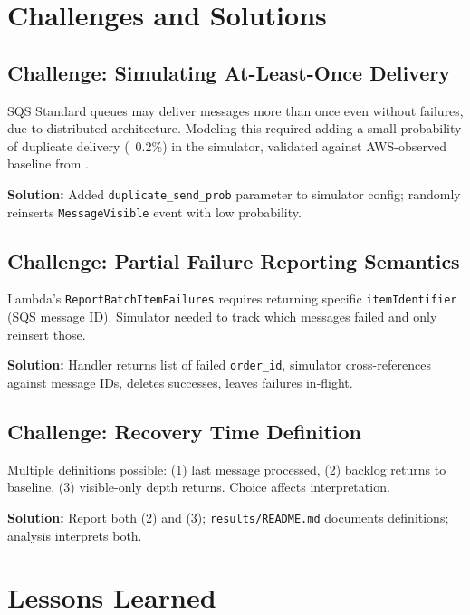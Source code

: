 \section{Challenges and Solutions}

\subsection{Challenge: Simulating At-Least-Once Delivery}

SQS Standard queues may deliver messages more than once even without failures, due to distributed architecture. Modeling this required adding a small probability of duplicate delivery (~0.2\%) in the simulator, validated against AWS-observed baseline from \citet{Kyrychenko2025}.

\textbf{Solution:} Added \texttt{duplicate\_send\_prob} parameter to simulator config; randomly reinserts \texttt{MessageVisible} event with low probability.

\subsection{Challenge: Partial Failure Reporting Semantics}

Lambda's \texttt{ReportBatchItemFailures} requires returning specific \texttt{itemIdentifier} (SQS message ID). Simulator needed to track which messages failed and only reinsert those.

\textbf{Solution:} Handler returns list of failed \texttt{order\_id}, simulator cross-references against message IDs, deletes successes, leaves failures in-flight.

\subsection{Challenge: Recovery Time Definition}

Multiple definitions possible: (1) last message processed, (2) backlog returns to baseline, (3) visible-only depth returns. Choice affects interpretation.

\textbf{Solution:} Report both (2) and (3); \texttt{results/README.md} documents definitions; analysis interprets both.

\section{Lessons Learned}

